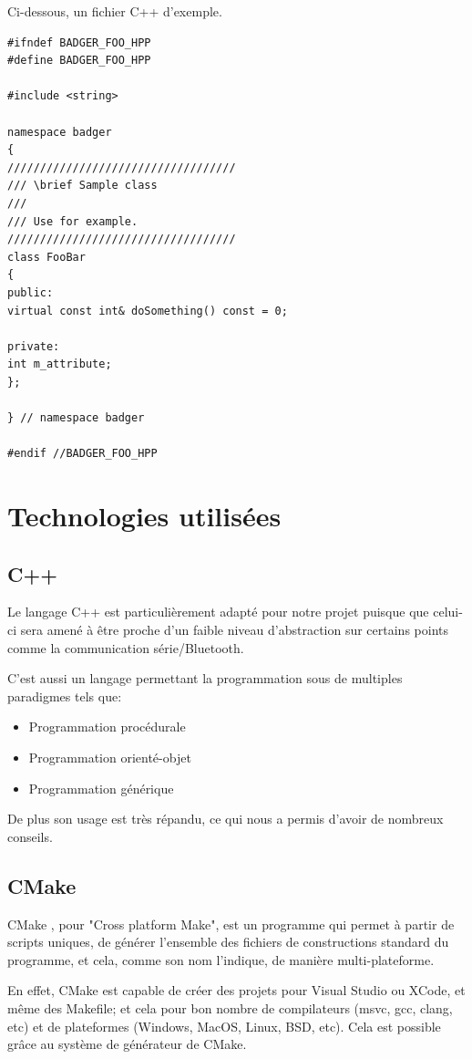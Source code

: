 Ci-dessous, un fichier C++ d'exemple.

\begin{lstlisting}
#ifndef BADGER_FOO_HPP
#define BADGER_FOO_HPP

#include <string>

namespace badger
{
///////////////////////////////////
/// \brief Sample class
///
/// Use for example.
///////////////////////////////////
class FooBar
{
public:
virtual const int& doSomething() const = 0;

private:
int m_attribute;
};

} // namespace badger

#endif //BADGER_FOO_HPP
\end{lstlisting}

    \section{Technologies utilisées}

        \subsection{C++}
Le langage C++ est particulièrement adapté pour notre projet puisque que celui-ci
sera amené à être proche d'un faible niveau d'abstraction sur certains points
comme la communication série/Bluetooth.

C'est aussi un langage permettant la programmation sous de multiples paradigmes
tels que:

    \begin{itemize}
    \item Programmation procédurale
    \item Programmation orienté-objet
    \item Programmation générique
    \end{itemize}

De plus son usage est très répandu, ce qui nous a permis d'avoir de nombreux conseils.

        \subsection{CMake}
CMake \cite{cmake}, pour "Cross platform Make", est un programme qui permet à partir 
de scripts uniques, de générer l'ensemble des fichiers de constructions standard 
du programme, et cela, comme son nom l'indique, de manière multi-plateforme.

En effet, CMake est capable de créer des projets pour Visual Studio ou XCode, et même 
des Makefile; et cela pour bon nombre de compilateurs (msvc, gcc, clang, etc) et 
de plateformes (Windows, MacOS, Linux, BSD, etc). Cela est possible grâce au
système de générateur de CMake.

